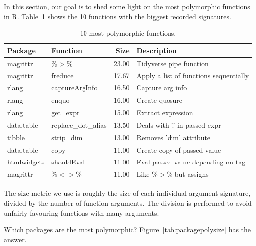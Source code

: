 \documentclass[acmsmall,10pt,review,anonymous]{acmart}\settopmatter{printfolios=true,printccs=false,printacmref=false}
\begin{document}

In this section, our goal is to shed some light on the most polymorphic functions in R.
Table~\ref{tab:bigpolyfuns} shows the 10 functions with the biggest recorded signatures.

\begin{table}[ht]
\label{tab:bigpolyfuns}
\centering
\begin{tabular}{llrl}
  \hline
Package & Function & Size & Description \\
  \hline
magrittr & \%$>$\% & 23.00 & Tidyverse pipe function \\
  magrittr & freduce & 17.67 & Apply a list of functions sequentially \\
  rlang & captureArgInfo & 16.50 & Capture arg info \\
  rlang & enquo & 16.00 & Create quosure \\
  rlang & get\_expr & 15.00 & Extract expression \\
  data.table & replace\_dot\_alias & 13.50 & Deals with '.' in passed expr \\
  tibble & strip\_dim & 13.00 & Removes 'dim' attribute \\
  data.table & copy & 11.00 & Create copy of passed value \\
  htmlwidgets & shouldEval & 11.00 & Eval passed value depending on tag \\
  magrittr & \%$<$$>$\% & 11.00 & Like \%$>$\% but assigns \\
   \hline
\end{tabular}
\caption{10 most polymorphic functions.}
\end{table}

The size metric we use is roughly the size of each individual argument signature, divided by the number of function arguments.
The division is performed to avoid unfairly favouring functions with many arguments.

Which packages are the most polymorphic?
Figure~\ref{tab:packagepolysize} has the answer.
\end{document}
